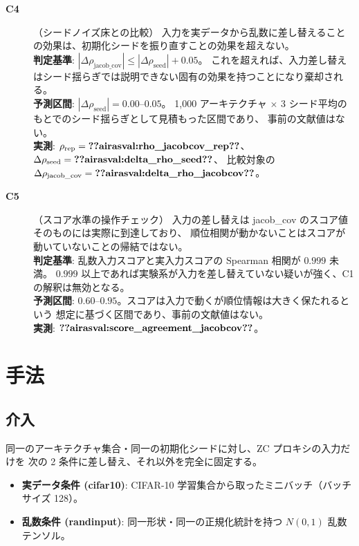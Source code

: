 \documentclass[11pt]{article}
\providecommand{\airasval}[1]{\textbf{??airasval:\detokenize{#1}??}}
\begin{document}
\begin{description}
\item[\textbf{C4}]（シードノイズ床との比較）
入力を実データから乱数に差し替えることの効果は、初期化シードを振り直すことの効果を超えない。\\
\textbf{判定基準}: $|\Delta\rho_{\mathrm{jacob\_cov}}| \le |\Delta\rho_{\mathrm{seed}}| + 0.05$。
これを超えれば、入力差し替えはシード揺らぎでは説明できない固有の効果を持つことになり棄却される。\\
\textbf{予測区間}: $|\Delta\rho_{\mathrm{seed}}| = 0.00$--$0.05$。
1{,}000 アーキテクチャ $\times$ 3 シード平均のもとでのシード揺らぎとして見積もった区間であり、
事前の文献値はない。\\
\textbf{実測}: $\rho_{\mathrm{rep}} = \airasval{rho_jacobcov_rep}$、
$\Delta\rho_{\mathrm{seed}} = \airasval{delta_rho_seed}$、
比較対象の $\Delta\rho_{\mathrm{jacob\_cov}} = \airasval{delta_rho_jacobcov}$。

\item[\textbf{C5}]（スコア水準の操作チェック）
入力の差し替えは jacob\_cov のスコア値そのものには実際に到達しており、
順位相関が動かないことはスコアが動いていないことの帰結ではない。\\
\textbf{判定基準}: 乱数入力スコアと実入力スコアの Spearman 相関が $0.999$ 未満。
$0.999$ 以上であれば実験系が入力を差し替えていない疑いが強く、C1 の解釈は無効となる。\\
\textbf{予測区間}: $0.60$--$0.95$。スコアは入力で動くが順位情報は大きく保たれるという
想定に基づく区間であり、事前の文献値はない。\\
\textbf{実測}: $\airasval{score_agreement_jacobcov}$。

\end{description}

\section{手法}

\subsection{介入}

同一のアーキテクチャ集合・同一の初期化シードに対し、ZC プロキシの入力だけを
次の 2 条件に差し替え、それ以外を完全に固定する。

\begin{itemize}
\item \textbf{実データ条件 (cifar10)}: CIFAR-10 学習集合から取ったミニバッチ（バッチサイズ 128）。
\item \textbf{乱数条件 (randinput)}: 同一形状・同一の正規化統計を持つ $N(0,1)$ 乱数テンソル。
\end{itemize}
\end{document}
